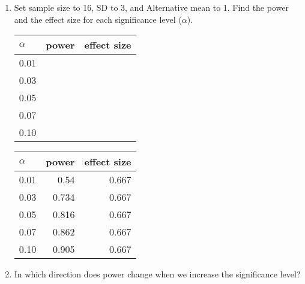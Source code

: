 \begin{enumerate}
\begin{key}
  {\it     Larger effect for same SD means more power, lower SD for same
    effect means more power.  In general, larger effect and lower
    SD means more power. A given effect size has the same power (for
    fixed $n$) no matter what SD and Alternative Mean we have.}
\end{key}


\begin{center}
  {\bf Try different significance levels.}
\end{center}

  \item  Set sample size to 16, SD to 3, and
    Alternative mean to 1. Find the power and the effect size for
    each significance level ($\alpha$).\\ 
\begin{students}\hline
  \begin{tabular}{ |l|r|r|}
    $\alpha$ & power& effect size\\ \hline
    {\large 0.01} && \\ \hline
    {\large 0.03} &&\\ \hline
    {\large 0.05} &&\\ \hline
    {\large 0.07} &&\\ \hline
    {\large 0.10} &&\\ \hline
  \end{tabular}
\end{students}

\begin{key}
  \begin{tabular}{ |l|r|r|}\hline
    $\alpha$ & power& effect size\\ \hline
    {\large 0.01}&0.54 & 0.667\\ \hline
    {\large 0.03}&0.734 &0.667\\ \hline
    {\large 0.05}&0.816 &0.667\\ \hline
    {\large 0.07}&0.862 &0.667\\ \hline
    {\large 0.10}&0.905 &0.667\\ \hline
  \end{tabular}
\end{key}

  \item    In which direction does power change when we increase the
    significance level?  
\begin{students}
 \vspace{3cm}
\end{students}


\end{enumerate}
